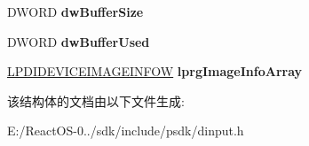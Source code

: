 \begin{DoxyCompactItemize}
\mbox{\label{struct___d_i_d_e_v_i_c_e_i_m_a_g_e_i_n_f_o_h_e_a_d_e_r_w_afa53a70d8161d140dcb49a917f9d54cd}} 
D\+W\+O\+RD {\bfseries dw\+Buffer\+Size}
\item 
\mbox{\label{struct___d_i_d_e_v_i_c_e_i_m_a_g_e_i_n_f_o_h_e_a_d_e_r_w_a54023301577002adcf9a7875a3a1e835}} 
D\+W\+O\+RD {\bfseries dw\+Buffer\+Used}
\item 
\mbox{\label{struct___d_i_d_e_v_i_c_e_i_m_a_g_e_i_n_f_o_h_e_a_d_e_r_w_a3562dc6959a1530e0a6c1975ec2f0ad9}} 
\hyperlink{struct___d_i_d_e_v_i_c_e_i_m_a_g_e_i_n_f_o_w}{L\+P\+D\+I\+D\+E\+V\+I\+C\+E\+I\+M\+A\+G\+E\+I\+N\+F\+OW} {\bfseries lprg\+Image\+Info\+Array}
\end{DoxyCompactItemize}


该结构体的文档由以下文件生成\+:\begin{DoxyCompactItemize}
\item 
E\+:/\+React\+O\+S-\/0../sdk/include/psdk/dinput.\+h\end{DoxyCompactItemize}
